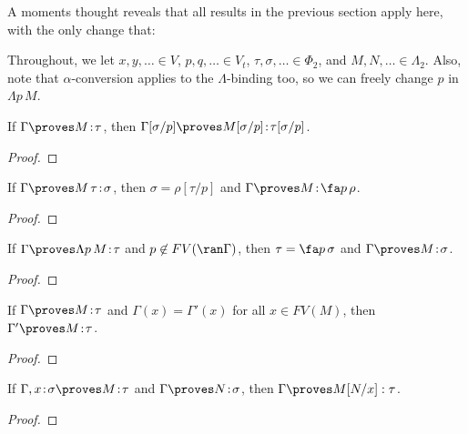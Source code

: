 \documentclass[reqno]{amsart}
\begin{document}
    A moments thought reveals that all results in the previous section apply here, with the only change that:

    \begin{notation}
        Throughout, we let $x,y,\ldots\in V$, $p,q,\ldots\in V_t$, $\tau,\sigma,\ldots\in\Phi_2$, and $M,N,\ldots\in\Lambda_2$. Also, note that $\alpha$-conversion applies to the $\Lambda$-binding too, so we can freely change $p$ in $\Lambda p\,M$.
    \end{notation}

    \begin{lemma}\label{lem:polymorphic_variable_substitution}
        If $\Gamma\proves M\!:\!\tau$, then $\Gamma[\sigma/p]\proves M[\sigma/p]\!:\!\tau[\sigma/p]$.
    \end{lemma}
    \begin{proof}
        \TODO
    \end{proof}

    \begin{lemma}\label{lem:polymorphic_generation_1}
        If $\Gamma\proves M\,\tau\!:\!\sigma$, then $\sigma=\rho[\tau/p]$ and $\Gamma\proves M\!:\!\fa p\,\rho$.
    \end{lemma}
    \begin{proof}
        \TODO
    \end{proof}

    \begin{lemma}\label{lem:polymorphic_generation_2}
        If $\Gamma\proves\Lambda p\,M\!:\!\tau$ and $p\not\in FV(\ran\Gamma)$, then $\tau=\fa p\,\sigma$ and $\Gamma\proves M\!:\!\sigma$.
    \end{lemma}
    \begin{proof}
        \TODO
    \end{proof}

    \begin{lemma}\label{lem:polymorphic_change_of_context}
        If $\Gamma\proves M\!:\!\tau$ and $\Gamma(x)=\Gamma'(x)$ for all $x\in FV(M)$, then $\Gamma'\proves M\!:\!\tau$.
    \end{lemma}
    \begin{proof}
        \TODO
    \end{proof}

    \begin{lemma}\label{lem:polymorphic_substitution}
        If $\Gamma,x\!:\!\sigma\proves M\!:\!\tau$ and $\Gamma\proves N\!:\!\sigma$, then $\Gamma\proves M[N/x]:\tau$.
    \end{lemma}
    \begin{proof}
        \TODO
    \end{proof}
\end{document}
